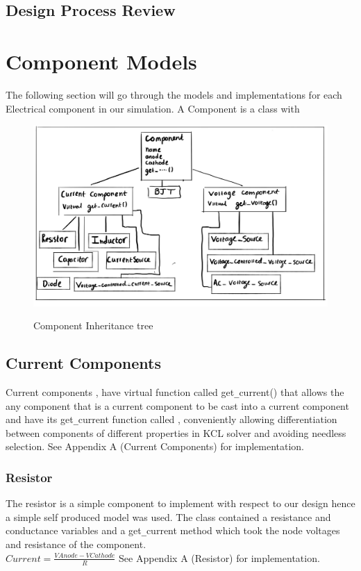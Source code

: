 \documentclass{article}
\begin{document}
\newpage

\subsection{Design Process Review}



\newpage



\section{Component Models}
The following section will go through the models and implementations for each Electrical component in our simulation.\mediumbreak
A Component is a class with
\begin{figure}[h]
    \caption{Component Inheritance tree}
    \centering
    \includegraphics[width=12cm]{images/Comphpp1.jpg}
    \label{fig:Comp}
\end{figure}

\subsection{Current Components}
Current components , have virtual function called get\verb|_|current() that allows the any component that is a current component to be cast into a current component and have its get\verb|_|current function called , conveniently allowing differentiation between components of different properties in KCL solver and avoiding needless selection.
\bigbreak
See Appendix A (Current Components) for implementation.
\medbreak


\subsubsection{Resistor}
The resistor is a simple component to implement with respect to our design hence a simple self produced model was used. The class contained a resistance and conductance variables and a get\verb|_|current method which took the node voltages and resistance of the component. \bigbreak\\$Current = \frac{VAnode - VCathode}{R}$
\bigbreak
See Appendix A (Resistor) for implementation.
\newpage
\end{document}
